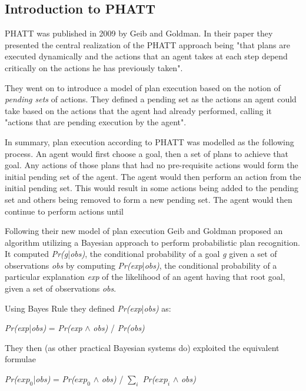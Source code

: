 \documentclass[parskip]{cs4rep}
\begin{document}
\subsection{Introduction to PHATT}

PHATT was published in 2009 by Geib and Goldman. In their paper they presented the central realization of the PHATT approach being "that plans are executed dynamically and the actions that an agent takes at each step depend critically on the actions he has previously taken". 

They went on to introduce a model of plan execution based on the notion of \textit{pending sets} of actions. They defined a pending set as the actions an agent could take based on the actions that the agent had already performed, calling it "actions that are pending execution by the agent".

In summary, plan execution according to PHATT was modelled as the following process. An agent would first choose a goal, then a set of plans to achieve that goal. Any actions of those plans that had no pre-requisite actions would form the initial pending set of the agent. The agent would then perform an action from the initial pending set. This would result in some actions being added to the pending set and others being removed to form a new pending set. The agent would then continue to perform actions until

Following their new model of plan execution Geib and Goldman proposed an algorithm utilizing a Bayesian approach to perform probabilistic plan recognition. It computed \textit{Pr(g}|\textit{obs)}, the conditional probability of a goal \textit{g} given a set of observations \textit{obs} by computing \textit{Pr(exp}|\textit{obs)}, the conditional probability of a particular explanation \textit{exp} of the likelihood of an agent having that root goal, given a set of observations \textit{obs}.

Using Bayes Rule they defined \textit{Pr(exp}|\textit{obs)} as:\newline

\centerline{
\textit{Pr(exp}|\textit{obs)} = \textit{Pr(exp} $\wedge$ \textit{obs)} / \textit{Pr(obs)}
}

They then (as other practical Bayesian systems do) exploited the equivalent formulae\newline

\centerline{
\textit{Pr($exp_0$}|\textit{obs)} = \textit{Pr($exp_0$} $\wedge$ \textit{obs)} / $\displaystyle\sum\nolimits_{i}$ \textit{Pr($exp_i$} $\wedge$ \textit{obs)}
}
\end{document}
